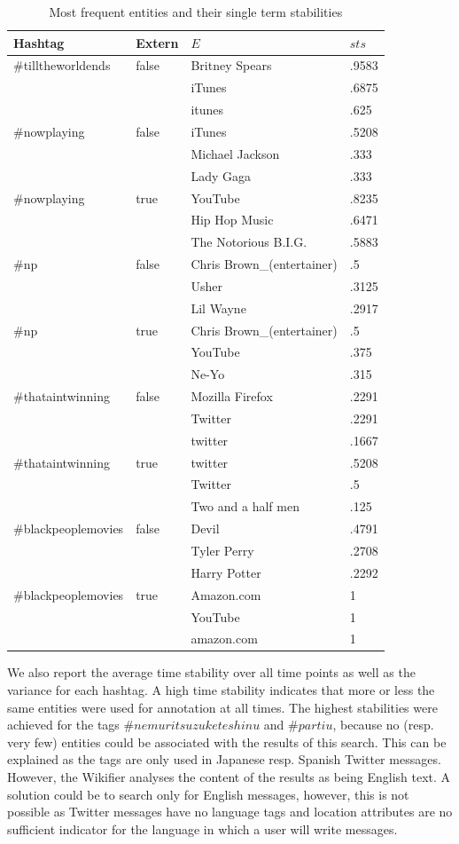 \documentclass{llncs}
\begin{document}
\begin{table}[ht]
\centering
\small
\begin{tabular}{l|l|l|l}
Hashtag & Extern & $E$ & $sts$ \\%
\hline
\#tilltheworldends & false & Britney Spears & .9583 \\
& &  iTunes & .6875 \\
& &  itunes & .625 \\ 
\hline
\#nowplaying & false & iTunes & .5208 \\
& & Michael Jackson & .333 \\
& & Lady Gaga & .333 \\
\hline
\#nowplaying & true & YouTube & .8235 \\
& & Hip Hop Music & .6471 \\
& & The Notorious B.I.G. & .5883 \\
\hline
\#np & false & Chris Brown\_(entertainer) & .5 \\
& & Usher & .3125 \\
& & Lil Wayne & .2917 \\
\hline
\#np & true & Chris Brown\_(entertainer) & .5 \\
& & YouTube & .375 \\
& & Ne-Yo & .315 \\
\hline
\#thataintwinning & false & Mozilla Firefox & .2291 \\
& & Twitter & .2291 \\
& & twitter & .1667 \\
\hline
\#thataintwinning & true & twitter & .5208 \\
& & Twitter & .5 \\
& & Two and a half men & .125 \\
\hline
\#blackpeoplemovies & false & Devil & .4791 \\
& & Tyler Perry & .2708 \\
& & Harry Potter & .2292 \\
\hline
\#blackpeoplemovies & true & Amazon.com & 1 \\
& & YouTube & 1 \\
& & amazon.com & 1
\end{tabular}
\label{tbl:entities}
\caption{Most frequent entities and their single term stabilities}
\end{table}

We also report the average time stability over all time points as well as the variance for each hashtag. A high time stability indicates that more or less the same entities were used for annotation at all times. The highest stabilities were achieved for the tags $\#nemuritsuzuketeshinu$ and $\#partiu$, because no (resp. very few) entities could be associated with the results of this search. This can be explained as the tags are only used in Japanese resp. Spanish Twitter messages. However, the Wikifier analyses the content of the results as being English text. A solution could be to search only for English messages, however, this is not possible as Twitter messages have no language tags and location attributes are no sufficient indicator for the language in which a user will write messages.
\end{document}
